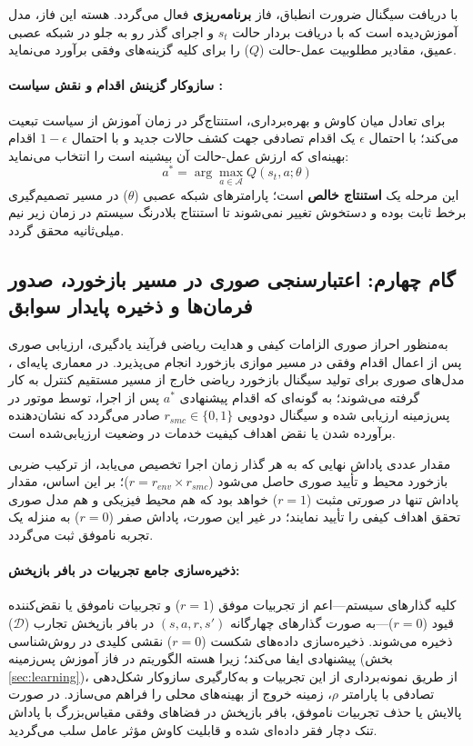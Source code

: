 \documentclass[oneside,openany,phd]{TMU-Thesis}
\begin{document}
با دریافت سیگنال ضرورت انطباق، فاز \textbf{برنامه‌ریزی} فعال می‌گردد. هسته این فاز، مدل آموزش‌دیده  است که با دریافت بردار حالت $s_t$ و اجرای گذر رو به جلو در شبکه عصبی عمیق، مقادیر مطلوبیت عمل-حالت ($Q$) را برای کلیه گزینه‌های وفقی برآورد می‌نماید.

\paragraph{سازوکار گزینش اقدام و نقش سیاست :}
برای تعادل میان کاوش و بهره‌برداری، استنتاج‌گر در زمان آموزش از سیاست  \cite{sutton2018reinforcement, mnih2015human} تبعیت می‌کند؛ با احتمال $\epsilon$ یک اقدام تصادفی جهت کشف حالات جدید و با احتمال $1-\epsilon$ اقدام بهینه‌ای که ارزش عمل-حالت آن بیشینه است را انتخاب می‌نماید:
\[
a^* = \arg\max_{a \in \mathcal{A}} Q(s_t, a; \theta)
\]
این مرحله یک \textbf{استنتاج خالص} است؛ پارامترهای شبکه عصبی ($\theta$) در مسیر تصمیم‌گیری برخط ثابت بوده و دستخوش تغییر نمی‌شوند تا استنتاج بلادرنگ سیستم در زمان زیر نیم میلی‌ثانیه محقق گردد.

\subsection{گام چهارم: اعتبارسنجی صوری در مسیر بازخورد، صدور فرمان‌ها و ذخیره پایدار سوابق}
\label{subsec:verification-execution}

به‌منظور احراز صوری الزامات کیفی و هدایت ریاضی فرآیند یادگیری، ارزیابی صوری پس از اعمال اقدام وفقی در مسیر موازی بازخورد انجام می‌پذیرد. در معماری پایه‌ای ، مدل‌های صوری برای تولید سیگنال بازخورد ریاضی خارج از مسیر مستقیم کنترل به کار گرفته می‌شوند؛ به گونه‌ای که اقدام پیشنهادی $a^*$ پس از اجرا، توسط موتور  \cite{david2015uppaal} در پس‌زمینه ارزیابی شده و سیگنال دودویی $r_{smc} \in \{0, 1\}$ صادر می‌گردد که نشان‌دهنده برآورده شدن یا نقض اهداف کیفیت خدمات در وضعیت ارزیابی‌شده است.

مقدار عددی پاداش نهایی که به هر گذار زمان اجرا تخصیص می‌یابد، از ترکیب ضربی بازخورد محیط و تأیید صوری حاصل می‌شود ($r = r_{env} \times r_{smc}$)؛ بر این اساس، مقدار پاداش تنها در صورتی مثبت ($r=1$) خواهد بود که هم محیط فیزیکی و هم مدل صوری تحقق اهداف کیفی را تأیید نمایند؛ در غیر این صورت، پاداش صفر ($r=0$) به منزله یک تجربه ناموفق ثبت می‌گردد. 

\paragraph{ذخیره‌سازی جامع تجربیات در بافر بازپخش:}
کلیه گذارهای سیستم—اعم از تجربیات موفق ($r=1$) و تجربیات ناموفق یا نقض‌کننده قیود ($r=0$)—به صورت گذارهای چهارگانه $(s, a, r, s')$ در بافر بازپخش تجارب ($\mathcal{D}$) ذخیره می‌شوند. ذخیره‌سازی داده‌های شکست ($r=0$) نقشی کلیدی در روش‌شناسی پیشنهادی ایفا می‌کند؛ زیرا هسته الگوریتم  در فاز آموزش پس‌زمینه (بخش \ref{sec:learning})، از طریق نمونه‌برداری از این تجربیات و به‌کارگیری سازوکار شکل‌دهی تصادفی با پارامتر $\rho$، زمینه خروج از بهینه‌های محلی را فراهم می‌سازد. در صورت پالایش یا حذف تجربیات ناموفق، بافر بازپخش در فضاهای وفقی مقیاس‌بزرگ با پاداش تنک دچار فقر داده‌ای شده و قابلیت کاوش مؤثر عامل سلب می‌گردید.
\end{document}
